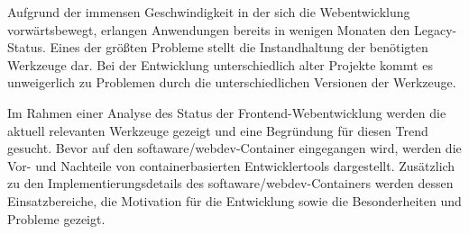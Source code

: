 Aufgrund der immensen Geschwindigkeit in der sich die Webentwicklung vorwärtsbewegt, erlangen Anwendungen bereits in wenigen Monaten den Legacy-Status.
Eines der größten Probleme stellt die Instandhaltung der benötigten Werkzeuge dar.
Bei der Entwicklung unterschiedlich alter Projekte kommt es unweigerlich zu Problemen durch die unterschiedlichen Versionen der Werkzeuge.

Im Rahmen einer Analyse des Status der Frontend-Webentwicklung werden die aktuell relevanten Werkzeuge gezeigt und eine Begründung für diesen Trend gesucht.
Bevor auf den softaware/webdev-Container eingegangen wird, werden die Vor- und Nachteile von containerbasierten Entwicklertools dargestellt.
Zusätzlich zu den Implementierungsdetails des softaware/webdev-Containers werden dessen Einsatzbereiche, die Motivation für die Entwicklung sowie die Besonderheiten und Probleme gezeigt.
